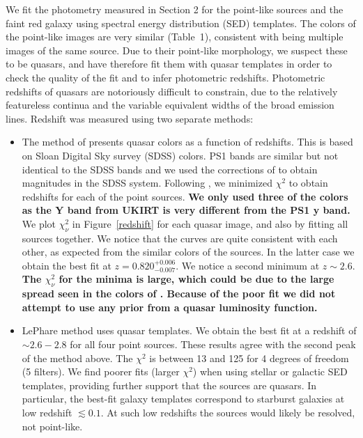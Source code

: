 \documentclass[manuscript]{aastex}
\begin{document}
We fit the photometry measured in Section 2 for the point-like sources and the faint red galaxy using spectral energy distribution (SED) templates. The colors of the point-like images are very similar (Table~1), consistent with being multiple images of the same source. Due to their point-like morphology, we suspect these to be quasars, and have therefore fit them with quasar templates in order to check the quality of the fit and to infer photometric redshifts. Photometric redshifts of quasars are notoriously difficult to constrain, due to the relatively featureless continua \citep{ric09} and the variable equivalent widths of the broad emission lines. Redshift was measured using two separate methods:
\begin{itemize}
\item The method of \citet{wu10} presents quasar colors as a function of redshifts. This is based on Sloan Digital Sky survey (SDSS) colors. PS1 bands are similar but not identical to the SDSS bands and we used the corrections of \citet{fin16} to obtain magnitudes in the SDSS system. Following \citet{wu10}, we minimized ${\chi}^2$ to obtain redshifts for each of the point sources. {\bf We only used three of the colors as the Y band from UKIRT is very different from the PS1 y band.} We plot $\chi^2_{\nu}$ in Figure~\ref{redshift} for each quasar image, and also by fitting all sources together. We notice that the curves are quite consistent with each other, as expected from the similar colors of the sources. In the latter case we obtain the best fit at $z = 0.820^{+0.006}_{-0.007}$. We notice a second minimum at $z \sim2.6$. {\bf The 
 $\chi^2_{\nu}$ for the minima is large, which could be due to the large spread seen in the colors of \citet{wu10}. Because of the poor fit we did not attempt to use any prior from a quasar luminosity function.}
\item LePhare \citep{arn99,ilb06} method uses quasar templates. We obtain the best fit at a redshift of $\sim 2.6-2.8$ for all four point sources.  These results agree with the second peak of the method above. The $\chi^2$ is between 13 and 125 for 4 degrees of freedom (5 filters). We find poorer fits (larger $\chi^2$) when using stellar or galactic SED templates, providing further support that the sources are quasars. In particular, the best-fit galaxy templates correspond to starburst galaxies at low redshift $\lesssim0.1$. At such low redshifts the sources would likely be resolved, not point-like. 

\end{itemize}
\end{document}
